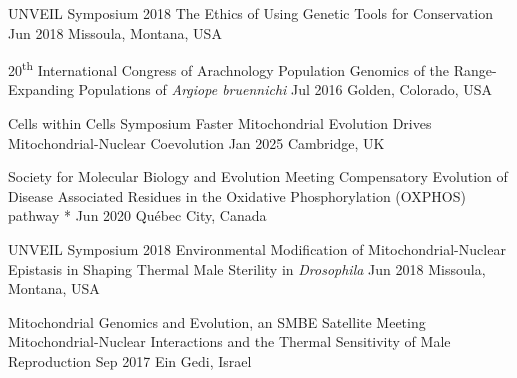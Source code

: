 
\begin{cventries}

  \cvpresentation
    {UNVEIL Symposium 2018}
    {The Ethics of Using Genetic Tools for Conservation}
    {Jun 2018}
    {Missoula, Montana, USA}

  \cvpresentation
    {20\textsuperscript{th} International Congress of Arachnology} %
    {Population Genomics of the Range-Expanding Populations of \textit{Argiope bruennichi}} %
     {Jul 2016} %
    {Golden, Colorado, USA} %

\end{cventries}

\vspace{\baselineskip}


\begin{cventries}


  \cvpresentation
    {Cells within Cells Symposium}
    {Faster Mitochondrial Evolution Drives Mitochondrial-Nuclear Coevolution}
    {Jan 2025}
    {Cambridge, UK}

  \cvpresentation
    {Society for Molecular Biology and Evolution Meeting} %
    {Compensatory Evolution of Disease Associated Residues in the Oxidative Phosphorylation (OXPHOS) pathway *} %
    {Jun 2020} %
    {Qu\'ebec City, Canada} %

  \cvpresentation
    {UNVEIL Symposium 2018} %
    {Environmental Modification of Mitochondrial-Nuclear Epistasis in Shaping Thermal Male Sterility in \textit{Drosophila}} %
    {Jun 2018} %
    {Missoula, Montana, USA} %

   \cvpresentation
    {Mitochondrial Genomics and Evolution, an SMBE Satellite Meeting}
    {Mitochondrial-Nuclear Interactions and the Thermal Sensitivity of Male Reproduction}
    {Sep 2017}
    {Ein Gedi, Israel}

\end{cventries}

